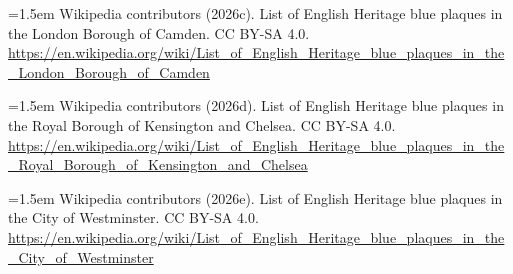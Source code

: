 \documentclass[11pt,a4paper]{article}
\begin{document}
\hangindent=1.5em Wikipedia contributors (2026c). List of English Heritage blue plaques in the London Borough of Camden. CC BY-SA 4.0. \url{https://en.wikipedia.org/wiki/List_of_English_Heritage_blue_plaques_in_the_London_Borough_of_Camden}

\hangindent=1.5em Wikipedia contributors (2026d). List of English Heritage blue plaques in the Royal Borough of Kensington and Chelsea. CC BY-SA 4.0. \url{https://en.wikipedia.org/wiki/List_of_English_Heritage_blue_plaques_in_the_Royal_Borough_of_Kensington_and_Chelsea}

\hangindent=1.5em Wikipedia contributors (2026e). List of English Heritage blue plaques in the City of Westminster. CC BY-SA 4.0. \url{https://en.wikipedia.org/wiki/List_of_English_Heritage_blue_plaques_in_the_City_of_Westminster}
\end{document}

